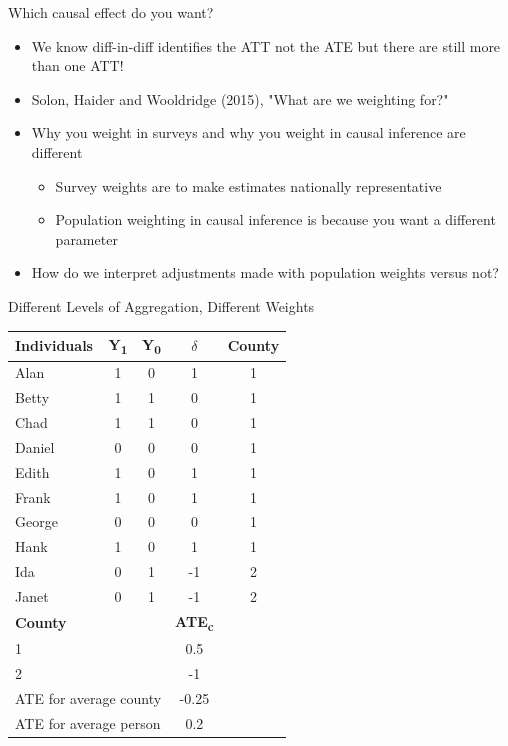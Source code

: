 \documentclass[aspectratio=169,11pt]{beamer}
\begin{document}
\begin{frame}{Which causal effect do you want?}

\begin{itemize}
\item We know diff-in-diff identifies the ATT not the ATE but there are still more than one ATT!
\item Solon, Haider and Wooldridge (2015), "What are we weighting for?"
\item Why you weight in surveys and why you weight in causal inference are different
	\begin{itemize}
	\item Survey weights are to make estimates nationally representative
	\item Population weighting in causal inference is because you want a different parameter
	\end{itemize}
\item How do we interpret adjustments made with population weights versus not?
\end{itemize}

\end{frame}




\begin{frame}{Different Levels of Aggregation, Different Weights}
\vspace{-0.6em}
\begin{table}[htbp]\centering
\footnotesize
\begin{tabular}{lcccc}
\toprule
\textbf{Individuals} & \textbf{Y\textsubscript{1}} & \textbf{Y\textsubscript{0}} & \textbf{$\delta$} & \textbf{County} \\
\midrule
Alan    & 1 & 0 & 1  & \cellcolor{yellow!30}1 \\
Betty   & 1 & 1 & 0  & \cellcolor{yellow!30}1 \\
Chad    & 1 & 1 & 0  & \cellcolor{yellow!30}1 \\
Daniel  & 0 & 0 & 0  & \cellcolor{yellow!30}1 \\
Edith   & 1 & 0 & 1  & \cellcolor{yellow!30}1 \\
Frank   & 1 & 0 & 1  & \cellcolor{yellow!30}1 \\
George  & 0 & 0 & 0  & \cellcolor{yellow!30}1 \\
Hank    & 1 & 0 & 1  & \cellcolor{yellow!30}1 \\
Ida     & 0 & 1 & -1 & \cellcolor{green!20}2 \\
Janet   & 0 & 1 & -1 & \cellcolor{green!20}2 \\
\midrule
\textbf{County} & & & \textbf{ATE\textsubscript{c}} & \\
\cellcolor{yellow!30}1 & & & \cellcolor{yellow!30}0.5 & \\
\cellcolor{green!20}2 & & & \cellcolor{green!20}-1 & \\
\midrule
\multicolumn{3}{l}{ATE for average county} & -0.25 & \\
\multicolumn{3}{l}{ATE for average person}   & 0.2 & \\
\bottomrule
\end{tabular}
\end{table}


\end{frame}
\end{document}
